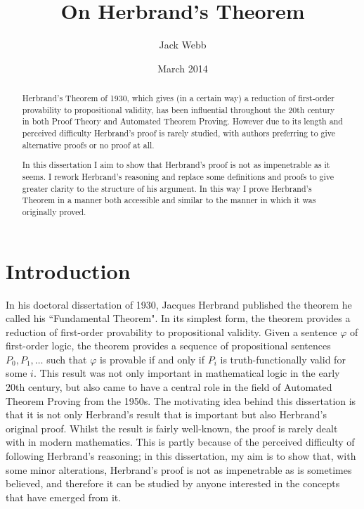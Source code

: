 \documentclass[a4paper,12pt]{report}
\theoremstyle{definition}
\begin{document}
\title{\LARGE {\bf On Herbrand's Theorem}}

\author{Jack Webb
}
\date {March 2014}

\maketitle


\begin{abstract}
Herbrand's Theorem of 1930, which gives (in a certain way) a reduction of first-order provability to propositional validity, has been influential throughout the 20th century in both Proof Theory and Automated Theorem Proving. However due to its length and perceived difficulty Herbrand's proof is rarely studied, with authors preferring to give alternative proofs or no proof at all.

In this dissertation I aim to show that Herbrand's proof is not as impenetrable as it seems. I rework Herbrand's reasoning and replace some definitions and proofs to give greater clarity to the structure of his argument.  In this way I prove Herbrand's Theorem in a manner both accessible and similar to the manner in which it was originally proved.

\end{abstract}

\newpage\mbox{}\newpage


\tableofcontents

\newpage\mbox{}\newpage

\chapter{Introduction}

In his doctoral dissertation of 1930, Jacques Herbrand published the theorem he called his ``Fundamental Theorem". In its simplest form, the theorem provides a reduction of first-order provability to propositional validity. Given a sentence $\varphi$ of first-order logic, the theorem provides a sequence of propositional sentences $P_0 , P_1, \ldots$ such that $\varphi$ is provable if and only if $P_i$ is truth-functionally valid for some $i$. This result was not only important in mathematical logic in the early 20th century, but also came to have a central role in the field of Automated Theorem Proving from the 1950s. The motivating idea behind this dissertation is that it is not only Herbrand's result that is important but also Herbrand's original proof. Whilst the result is fairly well-known, the proof is rarely dealt with in modern mathematics. This is partly because of the perceived difficulty of following Herbrand's reasoning; in this dissertation, my aim is to show that, with some minor alterations, Herbrand's proof is not as impenetrable as is sometimes believed, and therefore it can be studied by anyone interested in the concepts that have emerged from it. 
\end{document}
